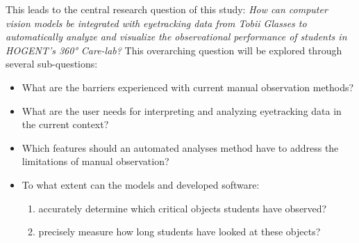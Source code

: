 \documentclass[english]{hogent-article}
\begin{document}
This leads to the central research question of this study:
\textit{How can computer vision models be integrated with eyetracking data from Tobii Glasses to automatically analyze and visualize the observational performance of students in HOGENT's 360° Care-lab?}
This overarching question will be explored through several sub-questions:
\begin{itemize}
  \item What are the barriers experienced with current manual observation methods?
  \item What are the user needs for interpreting and analyzing eyetracking data in the current context?
  \item Which features should an automated analyses method have to address the limitations of manual observation?
  \item To what extent can the models and developed software:
    \begin{enumerate}
      \item accurately determine which critical objects students have observed?
      \item precisely measure how long students have looked at these objects?
    \end{enumerate}
\end{itemize}
\end{document}
